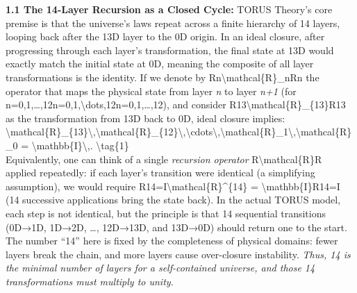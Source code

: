 \documentclass[
]{article}
\begin{document}
\textbf{1.1 The 14-Layer Recursion as a Closed Cycle:} TORUS Theory's
core premise is that the universe's laws repeat across a finite
hierarchy of 14 layers, looping back after the 13D layer to the 0D
origin\hspace{0pt}. In an ideal closure, after progressing through each
layer's transformation, the final state at 13D would exactly match the
initial state at 0D, meaning the composite of all layer transformations
is the identity. If we denote by
Rn\textbackslash mathcal\{R\}\_nRn\hspace{0pt} the operator that maps
the physical state from layer \emph{n} to layer \emph{n+1} (for
n=0,1,\ldots,12n=0,1,\textbackslash dots,12n=0,1,\ldots,12), and
consider R13\textbackslash mathcal\{R\}\_\{13\}R13\hspace{0pt} as the
transformation from 13D back to 0D, ideal closure implies:\\
\textbackslash mathcal\{R\}\_\{13\}\textbackslash,\textbackslash mathcal\{R\}\_\{12\}\textbackslash,\textbackslash cdots\textbackslash,\textbackslash mathcal\{R\}\_1\textbackslash,\textbackslash mathcal\{R\}\_0
= \textbackslash mathbb\{I\}\textbackslash,. \textbackslash tag\{1\}\\
Equivalently, one can think of a single \emph{recursion operator}
R\textbackslash mathcal\{R\}R applied repeatedly: if each layer's
transition were identical (a simplifying assumption), we would require
R14=I\textbackslash mathcal\{R\}\^{}\{14\} =
\textbackslash mathbb\{I\}R14=I (14 successive applications bring the
state back)\hspace{0pt}. In the actual TORUS model, each step is not
identical, but the principle is that 14 sequential transitions (0D→1D,
1D→2D, \ldots, 12D→13D, and 13D→0D) should return one to the start. The
number ``14'' here is fixed by the completeness of physical domains:
fewer layers break the chain, and more layers cause over-closure
instability\hspace{0pt}. \emph{Thus, 14 is the minimal number of layers
for a self-contained universe, and those 14 transformations must
multiply to unity.}
\end{document}
